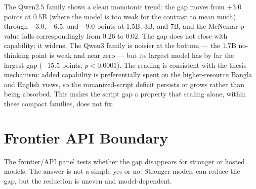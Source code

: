 The Qwen2.5 family shows a clean monotonic trend: the gap moves from $+3.0$ points at 0.5B (where the model is too weak for the contrast to mean much) through $-3.0$, $-6.5$, and $-9.0$ points at 1.5B, 3B, and 7B, and the McNemar p-value falls correspondingly from 0.26 to 0.02. The gap does not close with capability; it widens. The Qwen3 family is noisier at the bottom --- the 1.7B no-thinking point is weak and near zero --- but its largest model has by far the largest gap ($-15.5$ points, $p < 0.0001$). The reading is consistent with the thesis mechanism: added capability is preferentially spent on the higher-resource Bangla and English views, so the romanized-script deficit persists or grows rather than being absorbed. This makes the script gap a property that scaling alone, within these compact families, does not fix.

\section{Frontier API Boundary}

The frontier/API panel tests whether the gap disappears for stronger or hosted models. The answer is not a simple yes or no. Stronger models can reduce the gap, but the reduction is uneven and model-dependent.

\begin{table}[H]
\centering
\caption{Validation-200 v5 frontier/API panel. Difference columns report reviewed Banglish minus the comparison script.}
\label{tab:api-panel}
\small
{}
\end{table}

